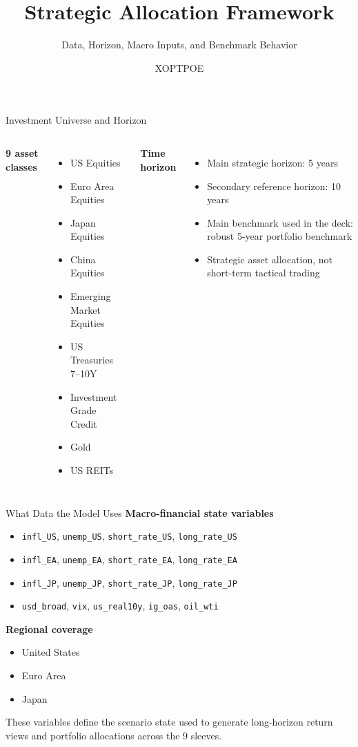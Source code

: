\documentclass[aspectratio=169,11pt]{beamer}
\title{Strategic Allocation Framework}
\subtitle{Data, Horizon, Macro Inputs, and Benchmark Behavior}
\author{XOPTPOE}
\date{}
\begin{document}
\begin{frame}
  \titlepage
\end{frame}

\begin{frame}{Investment Universe and Horizon}
\begin{columns}[T,totalwidth=\textwidth]
\textbf{9 asset classes}
\begin{itemize}
  \item US Equities
  \item Euro Area Equities
  \item Japan Equities
  \item China Equities
  \item Emerging Market Equities
  \item US Treasuries 7--10Y
  \item Investment Grade Credit
  \item Gold
  \item US REITs
\end{itemize}

\textbf{Time horizon}
\begin{itemize}
  \item Main strategic horizon: 5 years
  \item Secondary reference horizon: 10 years
  \item Main benchmark used in the deck: robust 5-year portfolio benchmark
  \item Strategic asset allocation, not short-term tactical trading
\end{itemize}
\end{columns}
\end{frame}

\begin{frame}{What Data the Model Uses}
\textbf{Macro-financial state variables}
\begin{itemize}
  \item \texttt{infl\_US}, \texttt{unemp\_US}, \texttt{short\_rate\_US}, \texttt{long\_rate\_US}
  \item \texttt{infl\_EA}, \texttt{unemp\_EA}, \texttt{short\_rate\_EA}, \texttt{long\_rate\_EA}
  \item \texttt{infl\_JP}, \texttt{unemp\_JP}, \texttt{short\_rate\_JP}, \texttt{long\_rate\_JP}
  \item \texttt{usd\_broad}, \texttt{vix}, \texttt{us\_real10y}, \texttt{ig\_oas}, \texttt{oil\_wti}
\end{itemize}
\vspace{0.6em}
\textbf{Regional coverage}
\begin{itemize}
  \item United States
  \item Euro Area
  \item Japan
\end{itemize}
\vspace{0.5em}
{\small\color{muted}These variables define the scenario state used to generate long-horizon return views and portfolio allocations across the 9 sleeves.}
\end{frame}
\end{document}

